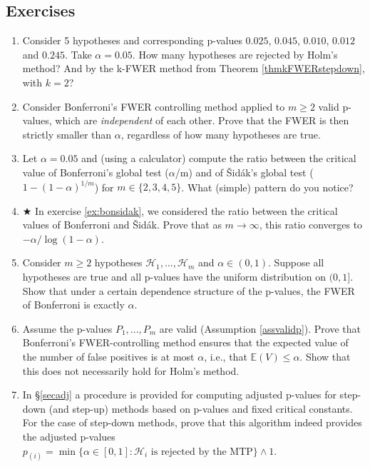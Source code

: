 \documentclass[11pt]{article}
\theoremstyle{plain}
\theoremstyle{definition}
\newcommand{\Hy}{\mathcal{H}}
\begin{document}
\subsection{Exercises}
\begin{enumerate}

\item Consider 5 hypotheses and corresponding  p-values  $0.025$, $0.045$, $0.010$, $0.012$ and $0.245$. Take $\alpha=0.05$. How many hypotheses are rejected by Holm's method? And by the k-FWER method from Theorem \ref{thmkFWERstepdown}, with $k=2$?






\item
Consider Bonferroni's FWER controlling method applied to $m\geq 2$ valid p-values, which are \emph{independent} of each other. Prove that the FWER is then strictly smaller than $\alpha$, regardless of how many hypotheses are true.


\item\label{ex:bonsidak} Let $\alpha=0.05$ and (using a calculator) compute the ratio between the critical value  of Bonferroni's global test ($\alpha$/m) and of  \v{S}id\'{a}k's global test ($1-(1-\alpha)^{1/m}$) for $m\in\{2,3,4,5\}$. What (simple) pattern do you notice?


\item $\bigstar$ In exercise \ref{ex:bonsidak}, we considered the ratio between the critical values of Bonferroni and \v{S}id\'{a}k. Prove that as $m\rightarrow\infty$, this ratio converges to  $-\alpha/\log(1-\alpha)$.


\item Consider $m\geq 2$ hypotheses $\Hy_1,...,\Hy_m$ and $\alpha\in(0,1)$. Suppose all hypotheses are true and all p-values have the uniform distribution on $(0,1]$. Show that under a certain dependence structure of the p-values, the FWER of Bonferroni is exactly $\alpha$.





\item Assume  the p-values $P_1,...,P_m$ are valid (Assumption \ref{assvalidp}). Prove that Bonferroni's FWER-controlling method ensures that  the expected value of the number of false positives is at most $\alpha$, i.e.,  that $\mathbb{E}(V)\leq \alpha$. Show that this does not necessarily hold for Holm's method.



\item In \S\ref{secadj} a procedure is provided for computing adjusted p-values for step-down (and step-up) methods based on p-values and  fixed critical constants. For the case of step-down methods, prove that this algorithm indeed provides the adjusted p-values $p_{(i)}=\min\{\alpha\in[0,1]: \Hy_i \text{ is rejected by the MTP}\}\wedge 1.$





\end{enumerate}
\end{document}
